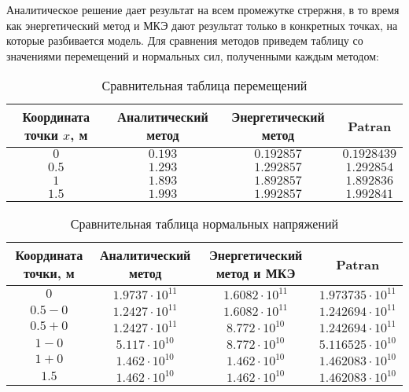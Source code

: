 Аналитическое решение дает результат на всем промежутке стрержня, в то время как энергетический метод и МКЭ дают результат только в конкретных точках, на которые разбивается модель. Для сравнения методов приведем таблицу со значениями перемещений и нормальных сил, полученными каждым методом:
\begin{table}[H]
    \caption{Сравнительная таблица перемещений}
    \label{tab7.1}
    \begin{center}
        \begin{tabular}{|c|c|c|c|}
            \hline
            Координата точки $x$, м & Аналитический метод & Энергетический метод & Patran \\
            \hline
            $0$ & $0.193$ & $0.192857$ & $0.1928439$ \\
            \hline
            $0.5$ & $1.293$ & $1.292857$ & $1.292854$ \\
            \hline
            $1$ & $1.893$ & $1.892857$ & $1.892836$ \\
            \hline
            $1.5$ & $1.993$ & $1.992857$ & $1.992841$ \\
            \hline
        \end{tabular}
    \end{center}
\end{table}
\begin{table}[H]
    \caption{Сравнительная таблица нормальных напряжений}
    \label{tab7.2}
    \begin{center}
        \begin{tabular}{|c|c|c|c|}
            \hline
            Координата точки, м & Аналитический метод & Энергетический метод и МКЭ & Patran \\
            \hline
            $0$ & $1.9737 \cdot 10^{11}$ & $1.6082 \cdot 10^{11}$ & $1.973735 \cdot 10^{11}$ \\
            \hline
            $0.5 - 0$ & $1.2427 \cdot 10^{11}$ & $1.6082 \cdot 10^{11}$ & $1.242694 \cdot 10^{11}$ \\
            \hline
            $0.5 + 0$ & $1.2427 \cdot 10^{11}$ & $8.772 \cdot 10^{10}$ & $1.242694 \cdot 10^{11}$ \\
            \hline
            $1 - 0$ & $5.117 \cdot 10^{10}$ & $8.772 \cdot 10^{10}$ & $5.116525 \cdot 10^{10}$ \\
            \hline
            $1 + 0$ & $1.462 \cdot 10^{10}$ & $1.462 \cdot 10^{10}$ & $1.462083 \cdot 10^{10}$ \\
            \hline
            $1.5$ & $1.462 \cdot 10^{10}$ & $1.462 \cdot 10^{10}$ & $1.462083 \cdot 10^{10}$ \\
            \hline
        \end{tabular}
    \end{center}
\end{table}
